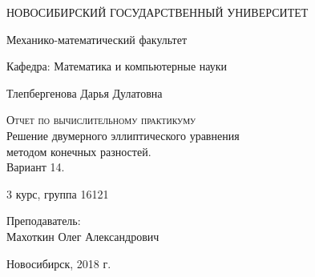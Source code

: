 \begin{titlepage}
  \begin{center}
     
    \vspace{0.5cm}
 
    НОВОСИБИРСКИЙ ГОСУДАРСТВЕННЫЙ УНИВЕРСИТЕТ
    \vspace{0.25cm}
     
    Механико-математический факультет
     
    Кафедра: Математика и компьютерные науки
    \vfill
     
     
    Тлепбергенова Дарья Дулатовна
    \vfill
 
    \textsc{Отчет по вычислительному практикуму}\\[5mm]
     
    {\LARGE Решение двумерного эллиптического уравнения \\
      методом конечных разностей.\\
    Вариант 14.\\[2mm]}
  \bigskip
     
    3 курс, группа 16121
    \end{center}
\vfill
 \newlength{\ML}
    \hfill\begin{minipage}{0.4\textwidth}
     Преподаватель:\\
    Махоткин Олег Александрович
    \end{minipage}%
\bigskip

 \vfill
\begin{center}
  Новосибирск, 2018 г.
\end{center}
\end{titlepage}